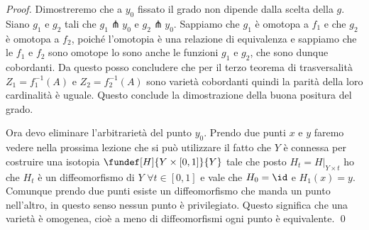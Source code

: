 \begin{proof}
 Dimostreremo che a $y_{0}$ fissato il grado non dipende dalla scelta della $g$. Siano $g_{1}$ e $g_{2}$ tali che $g_1 \pitchfork {y_0}$ e $g_{2} \pitchfork y_{0}$.
 Sappiamo che $g_{1}$ è omotopa a $f_{1}$ e che $g_{2}$ è omotopa a $f_{2}$, poiché l'omotopia è una relazione di equivalenza e sappiamo che le $f_{1}$ e $f_{2}$ sono omotope lo sono 
 anche le funzioni $g_{1}$ e $g_{2}$, che sono dunque cobordanti. Da questo posso concludere che per il terzo teorema di trasversalità $Z_{1} = f_{1}^{-1} (A)$ e $Z_{2} = f_{2}^{-1} (A)$ sono
 varietà cobordanti quindi la parità della loro cardinalità è uguale. Questo conclude la dimostrazione della buona positura del grado.
 
 
Ora devo eliminare l'arbitrarietà del punto $y_{0}$. Prendo due punti $x$ e $y$ faremo vedere nella prossima lezione che si può utilizzare il fatto che $Y$ è connessa per costruire una isotopia
$\fundef[H]{Y \times [0,1]}{Y}$ tale che posto $H_{t} = H|_{Y \times {t}}$ ho che $H_{t}$ è un diffeomorfismo di $Y$ $\forall t \in [0,1]$  e vale che $H_{0} = \id$ e $H_{1} (x) = y$.
Comunque prendo due punti esiste un diffeomorfismo che manda un punto nell'altro, in questo senso nessun punto è privilegiato. Questo significa che una varietà è omogenea, cioè a meno di 
diffeomorfismi ogni punto è equivalente.
\qed
\end{proof}



